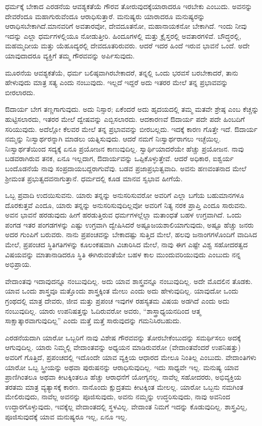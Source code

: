 ಧರ್ಮಕ್ಕೆ ಬೇಕಾದ ಎರಡನೆಯ ಆವಶ್ಯಕತೆಯೆ ಗೌರವ ತೋರುವುದಕ್ಕೆ\break ಯಾರಾದರೂ ಇರಬೇಕು ಎಂಬುದು. ಅವನನ್ನು ದೇವರೆಂದೂ ಮಹಾಗುರುವೆಂದೂ ಆರಾಧಿಸುತ್ತಾರೆ. ಮನುಷ್ಯರು ಯಾರಾದರೂ ಮನುಷ್ಯರನ್ನು ಆರಾಧಿಸಬೇಕಾಗಿದೆ.\break ಮಾನವರಿಗೆ ಅವತಾರವೋ, ದೇವದೂತನೋ, ಮಹಾನಾಯಕನೋ ಬೇಕಾಗಿದೆ. ಇಂದು ನೀವು ಇದನ್ನು ಎಲ್ಲಾ ಧರ್ಮಗಳಲ್ಲಿಯೂ ನೋಡುತ್ತೀರಿ. ಹಿಂದೂಗಳಲ್ಲಿ ಮತ್ತು ಕ್ರೈಸ್ತರಲ್ಲಿ ಅವತಾರಗಳಿವೆ. ಬೌದ್ಧರಲ್ಲಿ, ಮಹಮ್ಮದೀಯ ಮತ್ತು ಯೆಹೂದ್ಯರಲ್ಲಿ ದೇವದೂತರಿರುವರು. ಆದರೆ ಇದರ ಹಿಂದೆ ಇರುವ ಭಾವನೆ ಒಂದೆ. ಅದೇ ಯಾವುದಾದರೂ ವ್ಯಕ್ತಿಗೆ ತಮ್ಮ ಗೌರವವನ್ನು ಅರ್ಪಿಸುವುದು.

ಮೂರನೆಯ ಆವಶ್ಯಕತೆಯೆ, ಧರ್ಮ ಬಲಿಷ್ಠವಾಗಿರಬೇಕಾದರೆ, ತನ್ನಲ್ಲಿ ಒಂದು ಭರವಸೆ ಬರಬೇಕಾದರೆ, ತಾನು ಹೇಳುವುದು ಮಾತ್ರ ಸತ್ಯ ಎಂದು ನಂಬುವುದು. ಇಲ್ಲದೆ ಇದ್ದರೆ ಅದು ಇತರರ ಮೇಲೆ ತನ್ನ ಪ್ರಭಾವವನ್ನು ಬೀರಲಾರದು.

ಔದಾರ್ಯ ಬೇಗ ತಣ್ಣಗಾಗುವುದು. ಅದು ನಿಸ್ಸಾರ; ಏಕೆಂದರೆ ಅದು ಹೃದಯದಲ್ಲಿ ತಮ್ಮ ಮತವೇ ಶ್ರೇಷ್ಠ ಎಂಬ ಕೆಚ್ಚನ್ನು ಹುಟ್ಟಿಸಲಾರದು, ಇತರರ ಮೇಲೆ ದ್ವೇಷವನ್ನು ಎಬ್ಬಿಸಲಾರದು. ಆದಕಾರಣವೆ ಔದಾರ್ಯ ಪದೇ ಪದೇ ಹಿಂಬದಿಗೆ ಸರಿಯುವುದು. ಅದೆಲ್ಲೋ ಕೆಲವರ ಮೇಲೆ ತನ್ನ ಪ್ರಭಾವವನ್ನು ಬೀರಬಲ್ಲದು. ಇದಕ್ಕೆ ಕಾರಣ ಗೊತ್ತೇ ಇದೆ. ಔದಾರ್ಯ ನಮ್ಮನ್ನು ನಿಃಸ್ವಾರ್ಥರನ್ನಾಗಿ ಮಾಡಲು ಯತ್ನಿಸುವುದು. ಆದರೆ ನಮಗೆ ನಿಃಸ್ವಾರ್ಥರಾಗಲು ಇಚ್ಛೆಯಿಲ್ಲ. ನಿಃಸ್ವಾರ್ಥತೆಯಿಂದ ಸದ್ಯಕ್ಕೆ ಏನೂ ಪ್ರಯೋಜನ ಕಾಣುವುದಿಲ್ಲ. ಸ್ವಾರ್ಥಿಯಾದರೆಯೇ ಹೆಚ್ಚು ಪ್ರಯೋಜನ. ನಾವು ಬಡವರಾಗಿರುವ ತನಕ, ಏನೂ ಇಲ್ಲದಾಗ, ಔದಾರ್ಯವನ್ನು ಒಪ್ಪಿಕೊಳ್ಳುತ್ತೇವೆ. ಆದರೆ ಅಧಿಕಾರ, ಐಶ್ವರ್ಯ ಬಂದೊಡನೆಯೆ ನಾವು ಸಂಪ್ರದಾಯಬದ್ದರಾಗುವೆವು. ಬಡವ ಪ್ರಜಾಪ್ರಭುತ್ವವಾದಿ. ಅವನು ಹಣವಂತನಾದ ಮೇಲೆ ಶ‍್ರೀಮಂತ ಪ್ರಭುತ್ವದವನಾಗುತ್ತಾನೆ. ಧರ್ಮದಲ್ಲಿ ಕೂಡ ಮಾನವ ಸ್ವಭಾವ ಹೀಗೆಯೆ.

ಒಬ್ಬ ಪ್ರವಾದಿ ಉದಯಿಸುವನು. ಯಾರು ತನ್ನನ್ನು ಅನುಸರಿಸುವರೋ ಅವರಿಗೆ ಎಲ್ಲಾ ಬಗೆಯ ಬಹುಮಾನಗಳೂ ದೊರಕುತ್ತವೆ ಎಂದೂ, ಯಾರು ತನ್ನನ್ನು ಅನುಸರಿಸುವುದಿಲ್ಲವೋ ಅವರಿಗೆ ನಿತ್ಯ ನರಕ ಪ್ರಾಪ್ತಿ ಎಂದೂ ಸಾರುವನು. ಅವನ ಭಾವನೆ ಹರಡುವುದು ಹೀಗೆ ಹರಡುತ್ತಿರುವ ಧರ್ಮಗಳಲ್ಲೆಲ್ಲಾ ಮತಾಂಧತೆ ಬಹಳ ಉಗ್ರವಾಗಿದೆ. ಒಂದು ಪಂಗಡ ಇತರ ಪಂಗಡಗಳನ್ನು ಎಷ್ಟು ಉಗ್ರವಾಗಿ ದ್ವೇಷಿಸಿದರೆ ಅಷ್ಟೂ\break ಜಯಶಾಲಿಯಾಗುವುದು, ಅಷ್ಟೂ ಹೆಚ್ಚು ಜನರು ಅದರ ಗುಂಪಿಗೆ ಬರುವರು. ನಾನು ಪ್ರಪಂಚವನ್ನು ಬೇಕಾದಷ್ಟು ಸುತ್ತಿದ ಮೇಲೆ, ಹಲವು ಜನಾಂಗಗಳೊಂದಿಗೆ ವಾದಿಸಿದ ಮೇಲೆ, ಪ್ರಪಂಚದ ಸ್ಥಿತಿಗತಿಗಳನ್ನು ಕೂಲಂಕಷವಾಗಿ ವಿಚಾರಿಸಿದ ಮೇಲೆ, ನಾವು ಈಗ ಎಷ್ಟೇ ವಿಶ್ವ ಸಹೋದರತ್ವದ ವಿಷಯವನ್ನು ಮಾತಾನಾಡಿದರೂ ಸ್ಥಿತಿ ಈಗಿರುವಂತೆಯೇ ಬಹಳ ಕಾಲ ಮುಂದುವರಿಯುವುದು ಎಂಬುದು ನನ್ನ ಅಭಿಪ್ರಾಯ.

ವೇದಾಂತವು ಇದಾವುದನ್ನೂ ನಂಬುವುದಿಲ್ಲ. ಅದು ಯಾವ ಶಾಸ್ತ್ರವನ್ನೂ ನಂಬುವುದಿಲ್ಲ. ಅದೇ ಮೊದಲಿನ ತೊಡಕು. ಯಾವ ಒಂದು ಶಾಸ್ತ್ರವೂ ಮತ್ತೊಂದು ಶಾಸ್ತ್ರಕ್ಕಿಂತ ಮೇಲು ಎಂದು ಅದು ಹೇಳುವುದಿಲ್ಲ. ಯಾವುದೋ ಒಂದು ಗ್ರಂಥದಲ್ಲಿ ಮಾತ್ರ ದೇವರು, ಜೀವ ಮತ್ತು ಪ್ರಪಂಚ ಇವುಗಳ ರಹಸ್ಯತಮ ವಿಷಯ ಅಡಗಿದೆ ಎಂದು ಅದು ನಂಬುವುದಿಲ್ಲ. ಯಾರು ಉಪನಿಷತ್ತನ್ನು ಓದಿರುವರೋ ಅವರು, “ಶಾಸ್ತ್ರಾಧ್ಯಯನದಿಂದ ಆತ್ಮ ಸಾಕ್ಷಾತ್ಕಾರವಾಗುವುದಿಲ್ಲ” ಎಂದು ಮತ್ತೆ ಮತ್ತೆ ಸಾರುವುದನ್ನು ಗಮನಿಸಿರಬಹುದು.

ಎರಡನೆಯದಾಗಿ ಯಾರೋ ಒಬ್ಬರಿಗೆ ನಾವು ವಿಶೇಷ ಗೌರವವನ್ನು ತೋರಬೇಕೆಂಬುದನ್ನು ಸಮರ್ಥಿಸಲು ಅದಕ್ಕೆ ಆಗುವುದಿಲ್ಲ. ಯಾರು ನಿಮ್ಮಲ್ಲಿ ವೇದಾಂತವನ್ನು ಅಧ್ಯಯನ ಮಾಡಿರುವರೋ (ವೇದಾಂತವೆಂದರೆ ಉಪನಿಷತ್ತು) ಅವರಿಗೆ ಗೊತ್ತಿದೆ, ಪ್ರಪಂಚದಲ್ಲಿ ಇದೊಂದೇ ಯಾವ ವ್ಯಕ್ತಿಯ ಆಧಾರದ ಮೇಲೂ ನಿಂತಿಲ್ಲ ಎಂಬುದು. ವೇದಾಂತಿಗಳು ಯಾರೋ ಒಬ್ಬ ಸ್ತ್ರೀಯನ್ನು ಅಥವಾ ಪುರುಷನನ್ನು ಆರಾಧಿಸುವುದಿಲ್ಲ. ಇದು ಸಾಧ್ಯವೇ ಇಲ್ಲ. ಮನುಷ್ಯ ಯಾವ ಪ್ರಾಣಿಗಿಂತಲೂ ಅಥವಾ ಕೀಟಕ್ಕಿಂತಲೂ ಹೆಚ್ಚು ಆರಾಧನೆಗೆ ಯೋಗ್ಯನಲ್ಲ. ನಾವೆಲ್ಲ ಸಹೋದರರು, ಅಭಿವ್ಯಕ್ತಿಯ ತರತಮ ಮಾತ್ರ ವ್ಯತ್ಯಾಸಕ್ಕೆ ಕಾರಣ. ನಾನೊಂದು ಕ್ಷುದ್ರತಮ ಕೀಟಕ್ಕಿಂತ ಮೇಲಲ್ಲ. ಯಾರೋ ಒಬ್ಬನು ನಮಗಿಂತ ಮೇಲಿರುವುದು, ನಾವೆಲ್ಲ ಅವನನ್ನು ಪೂಜಿಸುವುದು, ಅವನು ನಮ್ಮನ್ನು ಉದ್ಧರಿಸುವುದು, ನಾವು ಅವನಿಂದ ಉದ್ಧಾರಗೊಳ್ಳುವುದು, ಇವಕ್ಕೆಲ್ಲ ವೇದಾಂತದಲ್ಲಿ ಸ್ಥಳವಿಲ್ಲ. ವೇದಾಂತ ನಿಮಗೆ ಇದನ್ನು ಕೊಡುವುದಿಲ್ಲ. ಶಾಸ್ತ್ರವಿಲ್ಲ, ಪೂಜಿಸುವುದಕ್ಕೆ ಯಾವ ಮನುಷ್ಯರೂ ಇಲ್ಲ, ಏನೂ ಇಲ್ಲ.

